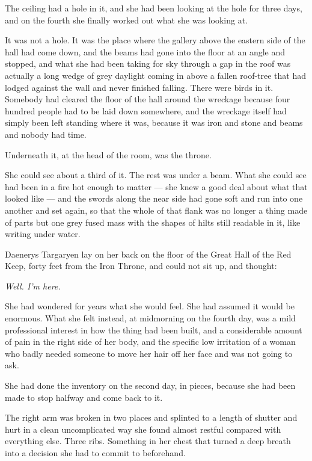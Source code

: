The ceiling had a hole in it, and she had been looking at the hole for three days, and on the fourth she finally worked out what she was looking at.

It was not a hole. It was the place where the gallery above the eastern side of the hall had come down, and the beams had gone into the floor at an angle and stopped, and what she had been taking for sky through a gap in the roof was actually a long wedge of grey daylight coming in above a fallen roof-tree that had lodged against the wall and never finished falling. There were birds in it. Somebody had cleared the floor of the hall around the wreckage because four hundred people had to be laid down somewhere, and the wreckage itself had simply been left standing where it was, because it was iron and stone and beams and nobody had time.

Underneath it, at the head of the room, was the throne.

She could see about a third of it. The rest was under a beam. What she could see had been in a fire hot enough to matter — she knew a good deal about what that looked like — and the swords along the near side had gone soft and run into one another and set again, so that the whole of that flank was no longer a thing made of parts but one grey fused mass with the shapes of hilts still readable in it, like writing under water.

Daenerys Targaryen lay on her back on the floor of the Great Hall of the Red Keep, forty feet from the Iron Throne, and could not sit up, and thought:

\textit{Well. I’m here.}

She had wondered for years what she would feel. She had assumed it would be enormous. What she felt instead, at midmorning on the fourth day, was a mild professional interest in how the thing had been built, and a considerable amount of pain in the right side of her body, and the specific low irritation of a woman who badly needed someone to move her hair off her face and was not going to ask.

\sceneBreak

She had done the inventory on the second day, in pieces, because she had been made to stop halfway and come back to it.

The right arm was broken in two places and splinted to a length of shutter and hurt in a clean uncomplicated way she found almost restful compared with everything else. Three ribs. Something in her chest that turned a deep breath into a decision she had to commit to beforehand.

